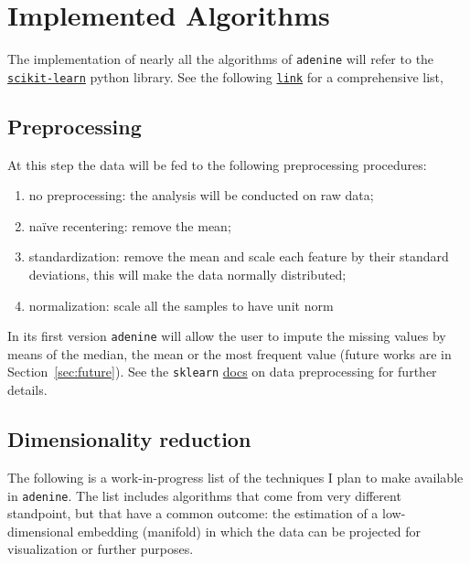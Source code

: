 \documentclass[paper=a4, fontsize=10pt]{scrartcl} %
\numberwithin{equation}{section} %
\numberwithin{figure}{section} %
\numberwithin{table}{section} %
\newcommand{\adenine}{{\tt adenine}\xspace}
\begin{document}
\section{Implemented Algorithms}

The implementation of nearly all the algorithms of \adenine will refer to the
\href{http://scikit-learn.org/stable/index.html}{\tt scikit-learn} python
library. See the following \href{http://scikit-learn.org/stable/unsupervised_learning.html}{\tt link} for a
comprehensive list,

\subsection{Preprocessing}

At this step the data will be fed to the following preprocessing procedures:
\begin{enumerate}[start = 0]
	\item no preprocessing: the analysis will be conducted on raw data;

	\item na\"ive recentering: remove the mean;

	\item standardization: remove the mean and scale each feature by 
	their standard deviations, this will make the data normally distributed;

	\item normalization: scale all the samples to have unit norm

\end{enumerate}

In its first version \adenine will allow the user to impute the missing values by means of the
median, the mean or the most frequent value (future works are in Section~\ref{sec:future}).
See the {\tt sklearn} \href{http://scikit-learn.org/stable/modules/preprocessing.html}{docs}
on data preprocessing for further details.

\subsection{Dimensionality reduction}

The following is a work-in-progress list of the techniques I plan to
make available in \adenine. The list includes algorithms that come
from very different standpoint, but that have a common outcome:
the estimation of a low-dimensional embedding (manifold) in which the data can
be projected for visualization or further purposes.
\end{document}
